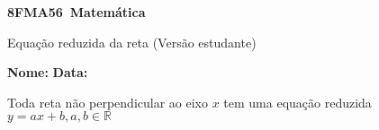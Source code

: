 \documentclass[a4paper,14pt]{article}
\begin{document}
	
	\noindent\textbf{8FMA56~Matemática} 
	
	\begin{center}Equação reduzida da reta (Versão estudante)
	\end{center}
	
	\noindent\textbf{Nome:} \underline{\hspace{10cm}}
	\noindent\textbf{Data:} \underline{\hspace{4cm}}
	
	
	
    \begin{multicols}{2}
    	\noindent Toda reta não perpendicular ao eixo $x$ tem uma equação reduzida $y = ax +b, a, b \in \mathbb{R}$
    	

\end{multicols}
\end{document}
